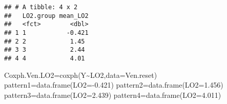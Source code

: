 \documentclass[
]{article}
\newenvironment{Shaded}{\begin{snugshade}}{\end{snugshade}}
\newcommand{\AttributeTok}[1]{\textcolor[rgb]{0.77,0.63,0.00}{#1}}
\newcommand{\FloatTok}[1]{\textcolor[rgb]{0.00,0.00,0.81}{#1}}
\newcommand{\FunctionTok}[1]{\textcolor[rgb]{0.00,0.00,0.00}{#1}}
\newcommand{\NormalTok}[1]{#1}
\newcommand{\OtherTok}[1]{\textcolor[rgb]{0.56,0.35,0.01}{#1}}
\newcommand{\SpecialCharTok}[1]{\textcolor[rgb]{0.00,0.00,0.00}{#1}}
\begin{document}
\begin{verbatim}
## # A tibble: 4 x 2
##   LO2.group mean_LO2
##   <fct>        <dbl>
## 1 1           -0.421
## 2 2            1.45 
## 3 3            2.44 
## 4 4            4.01
\end{verbatim}

\begin{Shaded}
\begin{Highlighting}[]
\NormalTok{Coxph.Ven.LO2}\OtherTok{=}\FunctionTok{coxph}\NormalTok{(Y}\SpecialCharTok{\textasciitilde{}}\NormalTok{LO2,}\AttributeTok{data=}\NormalTok{Ven.reset)}
\NormalTok{pattern1}\OtherTok{=}\FunctionTok{data.frame}\NormalTok{(}\AttributeTok{LO2=}\SpecialCharTok{{-}}\FloatTok{0.421}\NormalTok{)}
\NormalTok{pattern2}\OtherTok{=}\FunctionTok{data.frame}\NormalTok{(}\AttributeTok{LO2=}\FloatTok{1.456}\NormalTok{)}
\NormalTok{pattern3}\OtherTok{=}\FunctionTok{data.frame}\NormalTok{(}\AttributeTok{LO2=}\FloatTok{2.439}\NormalTok{)}
\NormalTok{pattern4}\OtherTok{=}\FunctionTok{data.frame}\NormalTok{(}\AttributeTok{LO2=}\FloatTok{4.011}\NormalTok{)}
\end{Highlighting}
\end{Shaded}
\end{document}
